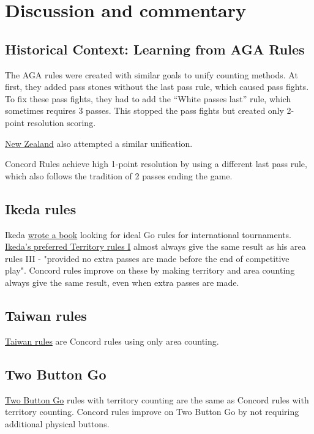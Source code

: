 \documentclass[11pt]{article}
\begin{document}
\newpage

\section*{Discussion and commentary}

\subsection*{Historical Context: Learning from AGA Rules}

The AGA rules were created with similar goals to unify counting methods.
At first, they added pass stones without the last pass rule, which caused pass fights.
To fix these pass fights, they had to add the ``White passes last'' rule, which sometimes requires 3 passes.
This stopped the pass fights but created only 2-point resolution scoring.

\href{https://go.org.nz/index.php/about-go/history-of-nz-rules-of-go}{New Zealand} also attempted a similar unification.

Concord Rules achieve high 1-point resolution by using a different last pass rule, which also follows the tradition of 2 passes ending the game.

\subsection*{Ikeda rules}
Ikeda \href{https://gobase.org/studying/rules/ikeda/}{wrote a book} looking for ideal Go rules for international tournaments.
\href{https://gobase.org/studying/rules/ikeda/?sec=e_rules}{Ikeda's preferred Territory rules I} almost always give the same result as his area rules III
- "provided no extra passes are made before the end of competitive play".
Concord rules improve on these by making territory and area counting always give the same result, even when extra passes are made.

\subsection*{Taiwan rules}
\href{https://senseis.xmp.net/?TaiwanRules}{Taiwan rules} are Concord rules using only area counting.

\subsection*{Two Button Go}
\href{https://senseis.xmp.net/?TwoButtonGo}{Two Button Go} rules with territory counting are the same as Concord rules with territory counting.
Concord rules improve on Two Button Go by not requiring additional physical buttons.
\end{document}

